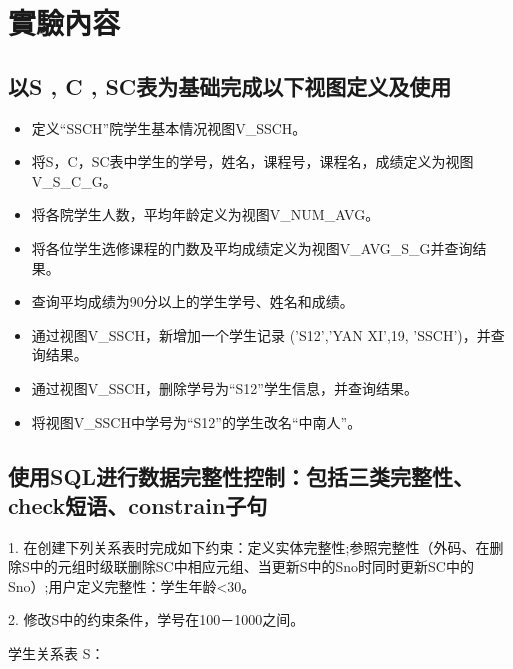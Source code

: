 \documentclass[12pt, a4paper]{report}
\begin{document}
\section{實驗內容}

\subsection{以S , C , SC表为基础完成以下视图定义及使用}

\begin{itemize}
    \item 定义“SSCH”院学生基本情况视图V\_SSCH。
    \item 将S，C，SC表中学生的学号，姓名，课程号，课程名，成绩定义为视图V\_S\_C\_G。
    \item 将各院学生人数，平均年龄定义为视图V\_NUM\_AVG。
    \item 将各位学生选修课程的门数及平均成绩定义为视图V\_AVG\_S\_G并查询结果。
    \item 查询平均成绩为90分以上的学生学号、姓名和成绩。
    \item 通过视图V\_SSCH，新增加一个学生记录 ('S12','YAN XI',19, 'SSCH')，并查询结果。
    \item 通过视图V\_SSCH，删除学号为“S12”学生信息，并查询结果。
    \item 将视图V\_SSCH中学号为“S12”的学生改名“中南人”。
\end{itemize}

\subsection{使用SQL进行数据完整性控制：包括三类完整性、check短语、constrain子句}

1. 在创建下列关系表时完成如下约束：定义实体完整性;参照完整性（外码、在删除S中的元组时级联删除SC中相应元组、当更新S中的Sno时同时更新SC中的Sno）;用户定义完整性：学生年龄<30。

2. 修改S中的约束条件，学号在100－1000之间。

学生关系表 S：

\begin{figure}[H] %
    \centering %
\end{figure}
\end{document}
